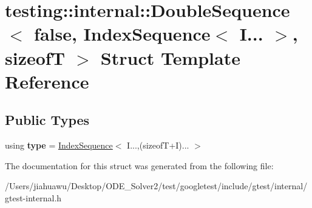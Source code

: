 \hypertarget{structtesting_1_1internal_1_1_double_sequence_3_01false_00_01_index_sequence_3_01_i_8_8_8_01_4_00_01sizeof_t_01_4}{}\section{testing\+:\+:internal\+:\+:Double\+Sequence$<$ false, Index\+Sequence$<$ I... $>$, sizeofT $>$ Struct Template Reference}
\label{structtesting_1_1internal_1_1_double_sequence_3_01false_00_01_index_sequence_3_01_i_8_8_8_01_4_00_01sizeof_t_01_4}
\subsection*{Public Types}
\begin{DoxyCompactItemize}
\item 
\mbox{\label{structtesting_1_1internal_1_1_double_sequence_3_01false_00_01_index_sequence_3_01_i_8_8_8_01_4_00_01sizeof_t_01_4_af11568320fe19e984e2eb5ab9ad026aa}} 
using {\bfseries type} = \mbox{\hyperlink{structtesting_1_1internal_1_1_index_sequence}{Index\+Sequence}}$<$ I...,(sizeofT+I)... $>$
\end{DoxyCompactItemize}


The documentation for this struct was generated from the following file\+:\begin{DoxyCompactItemize}
\item 
/\+Users/jiahuawu/\+Desktop/\+O\+D\+E\+\_\+\+Solver2/test/googletest/include/gtest/internal/gtest-\/internal.\+h\end{DoxyCompactItemize}
